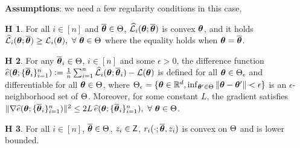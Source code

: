 \documentclass[a0,landscape]{a0poster}
\theoremstyle{definition}
\newtheorem{assumption}{H\!\!}
\begin{document}
\begin{multicols}{3}
\begin{tcolorbox}[colback=white!5!white,colframe=red!75!black,fonttitle=\sffamily\bfseries\large,title=Global Convergence Analysis]
\textbf{Assumptions}: we need a few regularity conditions in this case,
\begin{assumption} \label{ass:sur} For all $i \in [n]$ and $\overline{{\bm{\theta}}} \in \Theta$, $\widehat{\cal L}_{i}({\bm{\theta}};\overline{{\bm{\theta}}})$ is convex \wrt ${\bm{\theta}}$, and it holds
$\widehat{\cal L}_{i}({\bm{\theta}};\overline{{\bm{\theta}}}) \geq {\cal L}_i( {\bm{\theta}} ),~\forall~{\bm{\theta}} \in \Theta$ where the equality holds when ${\bm{\theta}} = \overline{{\bm{\theta}}}$.
\end{assumption}
\begin{assumption} \label{ass:diff}
For any $\overline{{\bm{\theta}}}_i \in \Theta$, $i \in [n]$ and some $\epsilon > 0$, the difference function $\widehat{e}({\bm{\theta}} ; \{ \overline{{\bm{\theta}}}_i \}_{i=1}^n ) \mathrel{\mathop:}= \frac{1}{n} \sum_{i=1}^n \widehat{\cal L}_{i}({\bm{\theta}};\overline{{\bm{\theta}}}_i ) - {\cal L}( {\bm{\theta}})$ is defined for all ${\bm{\theta}} \in \Theta_\epsilon$ and differentiable for all ${\bm{\theta}} \in \Theta$, where $\Theta_\epsilon = \{ {\bm{\theta}} \in \mathbb{R}^d, \inf_{{\bm{\theta}}' \in \Theta} \| {\bm{\theta}} - {\bm{\theta}}' \| < \epsilon \}$ is an $\epsilon$-neighborhood set of $\Theta$. Moreover, for some constant $L$, the gradient satisfies $\| {\nabla} \widehat{e}({\bm{\theta}}; \{ \overline{{\bm{\theta}}}_i \}_{i=1}^n)  \|^2 \leq 2 L\!~ \widehat{e}({\bm{\theta}}; \{ \overline{{\bm{\theta}}}_i \}_{i=1}^n) ,~\forall~{\bm{\theta}} \in \Theta$.
\end{assumption}
\begin{assumption} \label{ass:lips}
For all $i \in [n]$, $\overline{{\bm{\theta}}} \in \Theta$, $z_i \in \mathsf{Z}$, $r_{i}(\cdot;\overline{{\bm{\theta}}},z_i)$ is convex on $\Theta$ and is lower bounded.
\end{assumption}\vspace{-0.1in}


\end{tcolorbox}
\end{multicols}
\end{document}
